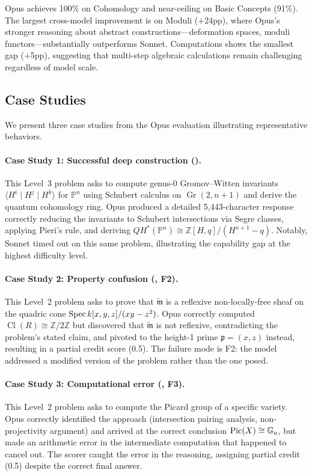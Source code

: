 Opus achieves 100\% on Cohomology and near-ceiling on Basic Concepts (91\%).
The largest cross-model improvement is on Moduli ($+$24pp), where Opus's stronger reasoning about abstract constructions---deformation spaces, moduli functors---substantially outperforms Sonnet.
Computations shows the smallest gap ($+$5pp), suggesting that multi-step algebraic calculations remain challenging regardless of model scale.

\subsection{Case Studies}

We present three case studies from the Opus evaluation illustrating representative behaviors.

\paragraph{Case Study 1: Successful deep construction ().}
This Level~3 problem asks to compute genus-0 Gromov--Witten invariants $\langle H^i \mid H^j \mid H^k \rangle$ for $\mathbb{P}^n$ using Schubert calculus on $\operatorname{Gr}(2,n+1)$ and derive the quantum cohomology ring.
Opus produced a detailed 5{,}443-character response correctly reducing the invariants to Schubert intersections via Segre classes, applying Pieri's rule, and deriving $QH^*(\mathbb{P}^n) \cong \mathbb{Z}[H,q]/(H^{n+1}-q)$.
Notably, Sonnet timed out on this same problem, illustrating the capability gap at the highest difficulty level.

\paragraph{Case Study 2: Property confusion (, F2).}
This Level~2 problem asks to prove that $\widetilde{\mathfrak{m}}$ is a reflexive non-locally-free sheaf on the quadric cone $\operatorname{Spec} k[x,y,z]/(xy-z^2)$.
Opus correctly computed $\operatorname{Cl}(R) \cong \mathbb{Z}/2\mathbb{Z}$ but discovered that $\widetilde{\mathfrak{m}}$ is not reflexive, contradicting the problem's stated claim, and pivoted to the height-1 prime $\mathfrak{p} = (x,z)$ instead, resulting in a partial credit score (0.5).
The failure mode is F2: the model addressed a modified version of the problem rather than the one posed.

\paragraph{Case Study 3: Computational error (, F3).}
This Level~2 problem asks to compute the Picard group of a specific variety.
Opus correctly identified the approach (intersection pairing analysis, non-projectivity argument) and arrived at the correct conclusion $\operatorname{Pic}(X) \cong \mathbb{G}_a$, but made an arithmetic error in the intermediate computation that happened to cancel out.
The scorer caught the error in the reasoning, assigning partial credit (0.5) despite the correct final answer.

